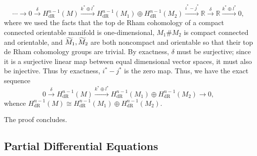 \documentclass{article}
\begin{document}
	\begin{equation*}
		\dotsm \to 0 \xrightarrow{\delta} H^{n-1}_{\text{dR}}(M) \xrightarrow{k^{\ast} \oplus l^{\ast}} H^{n-1}_{\text{dR}}(M_{1}) \oplus H^{n-1}_{\text{dR}}(M_{2}) \xrightarrow{i^{\ast}-j^{\ast}} \mathbb{R} \xrightarrow{\delta} \mathbb{R} \xrightarrow{k^{\ast} \oplus l^\ast} 0, 
	\end{equation*}
	where we used the facts that the top de Rham cohomology of a compact connected orientable manifold is one-dimensional, $M_{1}\# M_{2}$ is compact connected and orientable, and $\widetilde{M}_{1}, \widetilde{M}_{2}$ are both noncompact and orientable so that their top de Rham cohomology groups are trivial. By exactness, $\delta$ must be surjective; since it is a surjective linear map between equal dimensional vector spaces, it must also be injective. Thus by exactness, $i^{\ast} - j^{\ast}$ is the zero map. Thus, we have the exact sequence 
	\begin{equation*}
		0 \xrightarrow{\delta} H^{n-1}_{\text{dR}}(M) \xrightarrow{k^{\ast} \oplus l^{\ast}} H^{n-1}_{\text{dR}}(M_{1}) \oplus H^{n-1}_{\text{dR}}(M_{2}) \to 0, 
	\end{equation*}
	whence $H^{n-1}_{\text{dR}}(M) \cong H^{n-1}_{\text{dR}}(M_{1}) \oplus H^{n-1}_{\text{dR}}(M_{2})$. 
	
	The proof concludes. 
	
	\newpage 
	\subsection{Partial Differential Equations}
\end{document}
